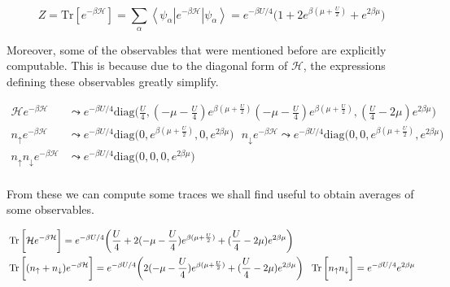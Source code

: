 \begin{equation}\label{eq:singleSitePartition}
Z = \text{Tr} [ e^{-\beta\mathcal{H} } ] = \sum_\alpha \left\langle \psi_\alpha \left|e^{-\beta \mathcal{H} } \right| \psi_\alpha \right\rangle = e^{-\beta U / 4} \bigg(1 + 2 e^{\beta(\mu + \frac{U}{2})} + e^{2 \beta \mu} \bigg)
\end{equation}

Moreover, some of the observables that were mentioned before are explicitly computable.
This is because due to the diagonal form of $\mathcal{H}$, the expressions defining these observables greatly simplify.

\begin{equation}
\begin{split}
\mathcal{H} e^{-\beta\mathcal{H} } &\leadsto e^{-\beta U / 4}  \text{diag}\bigg(\frac{U}{4}, (-\mu - \frac{U}{4})  e^{\beta(\mu + \frac{U}{2})} (-\mu - \frac{U}{4}) e^{\beta(\mu + \frac{U}{2})}, (\frac{U}{4} - 2\mu ) e^{2\beta \mu} \bigg) \\
n_{\uparrow} e^{-\beta\mathcal{H} } &\leadsto e^{-\beta U / 4}  \text{diag}\bigg(0, e^{\beta(\mu + \frac{U}{2})}, 0,  e^{2\beta \mu} \bigg) \,\,\,\,
n_{\downarrow} e^{-\beta\mathcal{H} } \leadsto e^{-\beta U / 4}  \text{diag}\bigg(0, 0, e^{\beta(\mu + \frac{U}{2})},   e^{2\beta \mu} \bigg) \\
n_{\uparrow} n_{\downarrow} e^{-\beta\mathcal{H} } &\leadsto e^{-\beta U / 4}  \text{diag}\bigg(0, 0, 0,   e^{2\beta \mu} \bigg) \\
\end{split}
\end{equation}

From these we can compute some traces we shall find useful to obtain averages of some observables.

\begin{equation}
\begin{split}
&\operatorname{Tr} \bigg[ \mathcal{H} e^{-\beta\mathcal{H} } \bigg] = e^{-\beta U / 4} \bigg(\frac{U}{4} + 2 (-\mu - \frac{U}{4})  e^{\beta(\mu + \frac{U}{2})} + (\frac{U}{4} - 2\mu ) e^{2\beta \mu} \bigg) \\
&\operatorname{Tr} \bigg[ (n_\uparrow + n_\downarrow ) e^{-\beta\mathcal{H} } \bigg] = e^{-\beta U / 4} \bigg(2 (-\mu - \frac{U}{4})  e^{\beta(\mu + \frac{U}{2})} + (\frac{U}{4} - 2\mu ) e^{2\beta \mu} \bigg) \,\,\,\, \operatorname{Tr} \bigg[ n_\uparrow n_\downarrow \bigg] = e^{-\beta U/4} e^{2\beta\mu}
\end{split}
\end{equation}

